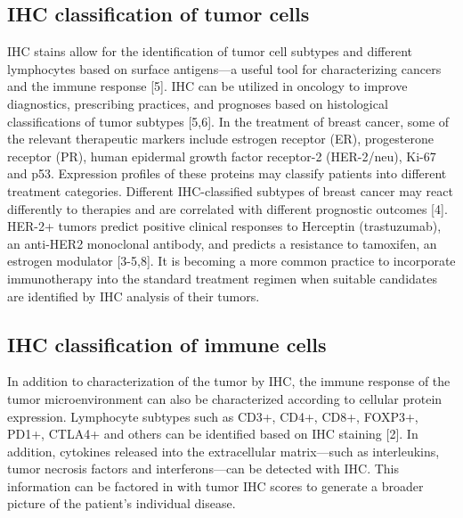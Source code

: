 \documentclass[12pt]{article}
\begin{document}
\subsection*{IHC classification of tumor cells}

IHC stains allow for the identification of tumor cell subtypes and different lymphocytes based on surface antigens---a useful tool for characterizing cancers and the immune response [5]. IHC can be utilized in oncology to improve diagnostics, prescribing practices, and prognoses based on histological classifications of tumor subtypes [5,6]. In the treatment of breast cancer, some of the relevant therapeutic markers include estrogen receptor (ER), progesterone receptor (PR), human epidermal growth factor receptor-2 (HER-2/neu), Ki-67 and p53. Expression profiles of these proteins may classify patients into different treatment categories. Different IHC-classified subtypes of breast cancer may react differently to therapies and are correlated with different prognostic outcomes [4]. HER-2+ tumors predict positive clinical responses to Herceptin (trastuzumab), an anti-HER2 monoclonal antibody, and predicts a resistance to tamoxifen, an estrogen modulator [3-5,8]. It is becoming a more common practice to incorporate immunotherapy into the standard treatment regimen when suitable candidates are identified by IHC analysis of their tumors. 


\subsection*{IHC classification of immune cells}

In addition to characterization of the tumor by IHC, the immune response of the tumor microenvironment can also be characterized according to cellular protein expression. Lymphocyte subtypes such as CD3+, CD4+, CD8+, FOXP3+, PD1+, CTLA4+ and others can be identified based on IHC staining [2]. In addition, cytokines released into the extracellular matrix---such as interleukins, tumor necrosis factors and interferons---can be detected with IHC. This information can be factored in with tumor IHC scores to generate a broader picture of the patient’s individual disease.
\end{document}
